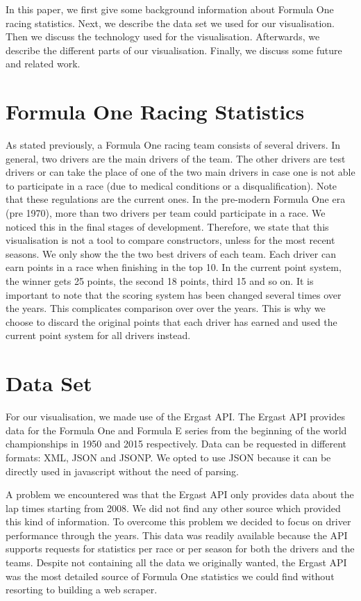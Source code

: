\documentclass{sigchi}
\begin{document}
In this paper, we first give some background information about Formula One racing statistics. Next, we describe the data set we used for our visualisation. Then we discuss the technology used for the visualisation. Afterwards, we describe the different parts of our visualisation. Finally, we discuss some future and related work. 

\section{Formula One Racing Statistics}
As stated previously, a Formula One racing team consists of several drivers. In general, two drivers are the main drivers of the team. The other drivers are test drivers or can take the place of one of the two main drivers in case one is not able to participate in a race (due to medical conditions or a disqualification). Note that these regulations are the current ones. In the pre-modern Formula One era (pre 1970), more than two drivers per team could participate in a race\cite{wiki}. We noticed this in the final stages of development. Therefore, we state that this visualisation is not a tool to compare constructors, unless for the most recent seasons. We only show the the two best drivers of each team.  Each driver can earn points in a race when finishing in the top 10. In the current point system, the winner gets 25 points, the second 18 points, third 15 and so on. It is important to note that the scoring system has been changed several times over the years\cite{wikipoints}. This complicates comparison over over the years. This is why we choose to discard the original points that each driver has earned and used the current point system for all drivers instead.

\section{Data Set}
For our visualisation, we made use of the Ergast API\cite{ergast}. The Ergast API provides data for the Formula One and Formula E series from the beginning of the world championships in 1950 and 2015 respectively. Data can be requested in different formats: XML, JSON and JSONP. We opted to use JSON because it can be directly used in javascript without the need of parsing. 

A problem we encountered was that the Ergast API only provides data about the lap times starting from 2008. We did not find any other source which provided this kind of information. To overcome this problem we decided to focus on driver performance through the years. This data was readily available because the API supports requests for statistics per race or per season for both the drivers and the teams. Despite not containing all the data we originally wanted, the Ergast API was the most detailed source of Formula One statistics we could find without resorting to building  a web scraper. 
\end{document}
